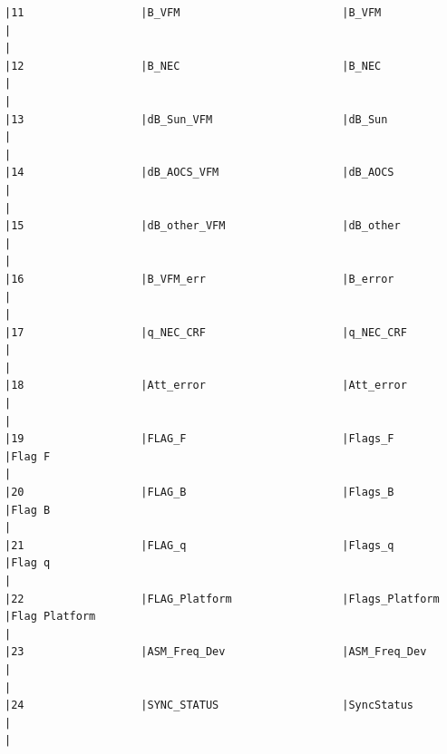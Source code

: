 \begin{verbatim}
|11                  |B_VFM                         |B_VFM                         |                                                                                                    |
|12                  |B_NEC                         |B_NEC                         |                                                                                                    |
|13                  |dB_Sun_VFM                    |dB_Sun                        |                                                                                                    |
|14                  |dB_AOCS_VFM                   |dB_AOCS                       |                                                                                                    |
|15                  |dB_other_VFM                  |dB_other                      |                                                                                                    |
|16                  |B_VFM_err                     |B_error                       |                                                                                                    |
|17                  |q_NEC_CRF                     |q_NEC_CRF                     |                                                                                                    |
|18                  |Att_error                     |Att_error                     |                                                                                                    |
|19                  |FLAG_F                        |Flags_F                       |Flag F                                                                                              |
|20                  |FLAG_B                        |Flags_B                       |Flag B                                                                                              |
|21                  |FLAG_q                        |Flags_q                       |Flag q                                                                                              |
|22                  |FLAG_Platform                 |Flags_Platform                |Flag Platform                                                                                       |
|23                  |ASM_Freq_Dev                  |ASM_Freq_Dev                  |                                                                                                    |
|24                  |SYNC_STATUS                   |SyncStatus                    |                                                                                                    |

\end{verbatim}
